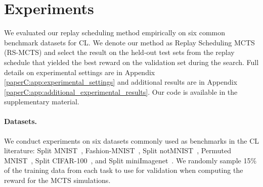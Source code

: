 



\section{Experiments}\label{paperC:sec:experiments}

We evaluated our replay scheduling method empirically on six common benchmark datasets for CL. 
We denote our method as Replay Scheduling MCTS (RS-MCTS) and select the result on the held-out test sets from the replay schedule that yielded the best reward on the validation set during the search.
Full details on experimental settings are in Appendix \ref{paperC:app:experimental_settings} and additional results are in Appendix \ref{paperC:app:additional_experimental_results}. %
Our code is available in the supplementary material. %

\vspace{-3mm}
\paragraph{Datasets.} We conduct experiments on six datasets commonly used as benchmarks in the CL literature: Split MNIST~, Fashion-MNIST~, Split notMNIST~, Permuted MNIST~, Split CIFAR-100~, and Split miniImagenet~. We randomly sample 15\% of the training data from each task to use for validation when computing the reward for the MCTS simulations. 

\vspace{-3mm}
